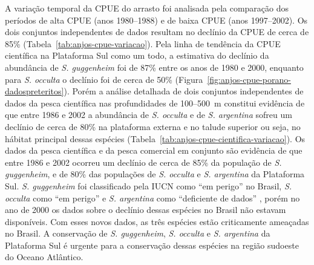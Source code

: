 \documentclass[a4paper,11pt,twoside,showtrims,onecolumn,openright,final]{memoir}
\begin{document}
A variação temporal da CPUE do arrasto foi analisada pela comparação dos períodos 
de alta CPUE (anos 1980--1988) e de baixa CPUE (anos 1997--2002). 
Os dois conjuntos independentes de dados resultam no declínio da CPUE de cerca de 85\% (Tabela~\ref{tab:anjos-cpue-variacao}). 
Pela linha de tendência da CPUE científica na Plataforma Sul como um todo, a estimativa 
do declínio da abundância de \emph{S. guggenheim} foi de 87\% entre os anos de 1980 e 2000, 
enquanto para \emph{S. occulta} o declínio foi de cerca de 50\% (Figura~\ref{fig:anjos-cpue-porano-dadospreteritos}). %
Porém a análise detalhada de dois conjuntos independentes de dados da pesca científica 
nas profundidades de 100--500~m constitui evidência de que entre 1986 e 2002 
a abundância de \emph{S. occulta} e de \emph{S. argentina} sofreu um declínio de cerca 
de 80\% na plataforma externa e no talude superior ou seja, no hábitat principal 
dessas espécies (Tabela~\ref{tab:anjos-cpue-cientifica-variacao}).  %
Os dados da pesca científica e da pesca comercial em conjunto são evidência de que 
entre 1986 e 2002 ocorreu um declínio de cerca de 85\% da população de \emph{S. guggenheim}, 
e de 80\% das populações de \emph{S. occulta} e \emph{S. argentina} da Plataforma Sul. 
\emph{S. guggenheim} foi classificado pela IUCN como ``em perigo'' no Brasil, 
\emph{S. occulta} como ``em perigo'' e \emph{S. argentina} 
como ``deficiente de dados'' \citep{chiaramonte2004a,chiaramonte2004b,chiaramonte2004c}, %
porém no ano de 2000 os dados sobre o declínio dessas espécies no Brasil não estavam disponíveis. 
Com esses novos dados, as três espécies estão criticamente ameaçadas no Brasil. 
A conservação de \emph{S. guggenheim}, \emph{S. occulta} e \emph{S. argentina} da Plataforma Sul 
é urgente para a conservação dessas espécies na região sudoeste do Oceano Atlântico.

%
%
\end{document}
